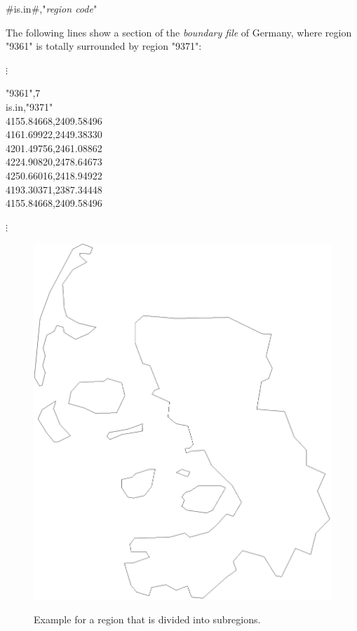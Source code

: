 #is.in#,"{\em region code}"

The following lines show a section of the {\em boundary file} of Germany, where region "9361" is totally surrounded by region "9371":

\footnotesize

\hspace{1cm} $\vdots$

"9361",7 \\
is.in,"9371" \\
4155.84668,2409.58496 \\
4161.69922,2449.38330 \\
4201.49756,2461.08862 \\
4224.90820,2478.64673 \\
4250.66016,2418.94922 \\
4193.30371,2387.34448 \\
4155.84668,2409.58496

\hspace{1cm} $\vdots$

\normalsize

\begin{figure}[hb]
\centering
\includegraphics [scale=0.3]{grafiken/reg1054.eps}
{\em\caption{\label{westsub} Example for a region that is divided
into subregions.}}
\end{figure}

